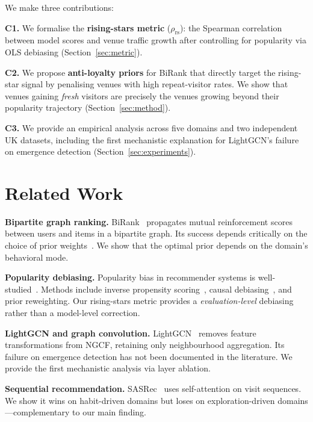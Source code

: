 \documentclass{article}
\begin{document}
We make three contributions:

\textbf{C1.} We formalise the \textbf{rising-stars metric}
($\rho_{\text{rs}}$): the Spearman correlation between model scores and
venue traffic growth after controlling for popularity via OLS debiasing
(Section~\ref{sec:metric}).

\textbf{C2.} We propose \textbf{anti-loyalty priors} for BiRank that
directly target the rising-star signal by penalising venues with high
repeat-visitor rates. We show that venues gaining \emph{fresh} visitors
are precisely the venues growing beyond their popularity trajectory
(Section~\ref{sec:method}).

\textbf{C3.} We provide an empirical analysis across five domains and
two independent UK datasets, including the first mechanistic explanation
for LightGCN's failure on emergence detection
(Section~\ref{sec:experiments}).

\section{Related Work}
\label{sec:related}

\textbf{Bipartite graph ranking.}
BiRank~\cite{he2017birank} propagates mutual reinforcement scores between
users and items in a bipartite graph. Its success depends critically on
the choice of prior weights~\cite{bellogin2013birank}.
We show that the optimal prior depends on the domain's behavioral mode.

\textbf{Popularity debiasing.}
Popularity bias in recommender systems is well-studied~\cite{abdollahpouri2019}.
Methods include inverse propensity scoring~\cite{schnabel2016recommendations},
causal debiasing~\cite{zhang2021causal}, and prior reweighting.
Our rising-stars metric provides a \emph{evaluation-level} debiasing
rather than a model-level correction.

\textbf{LightGCN and graph convolution.}
LightGCN~\cite{he2020lightgcn} removes feature transformations from NGCF,
retaining only neighbourhood aggregation.
Its failure on emergence detection has not been documented in the literature.
We provide the first mechanistic analysis via layer ablation.

\textbf{Sequential recommendation.}
SASRec~\cite{kang2018sasrec} uses self-attention on visit sequences.
We show it wins on habit-driven domains but loses on exploration-driven
domains---complementary to our main finding.
\end{document}

